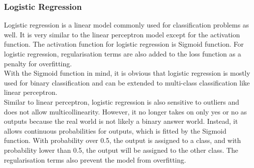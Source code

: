 \documentclass[10pt, a4paper, twocolumn]{article} %
\begin{document}
\subsubsection{Logistic Regression}
Logistic regression\citep{Arun}\citep{Mazen}\citep{Tanvi} is a linear model commonly used for classification problems as well. It is very similar to the 
linear perceptron model except for the activation function. The activation function for logistic regression is Sigmoid function. 
For logistic regression, regularisation terms are also added to the loss function as a penalty for overfitting.\\[10pt]
With the Sigmoid function in mind, it is obvious that logistic regression is mostly used for binary classification and can 
be extended to multi-class classification like linear perceptron.\\[10pt]
Similar to linear perceptron, logistic regression is also sensitive to outliers and does not allow multicollinearity. However, it 
no longer takes on only yes or no as outputs because the real world is not likely a binary answer world. Instead, it allows 
continuous probabilities for outputs, which is fitted by the Sigmoid function. With probability over 0.5, the output is 
assigned to a class, and with probability lower than 0.5, the output will be assigned to the other class. The regularisation 
terms also prevent the model from overfitting\citep{Geek}.
\end{document}
